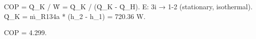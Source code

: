 COP = Q̇_K / Ẇ = Q̇_K / (Q̇_K - Q̇_H).  
E: 3i → 1-2 (stationary, isothermal).  
Q̇_K = ṁ_R134a * (h_2 - h_1) = 720.36 W.  

COP = 4.299.